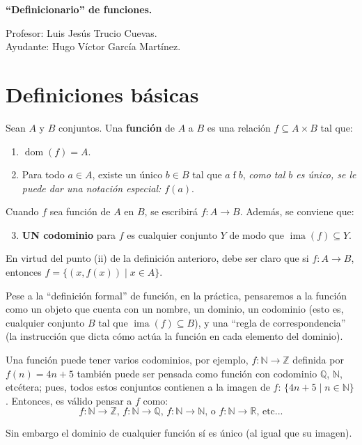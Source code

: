 \documentclass[letterpaper,DIV=14,headsepline,12pt]{scrartcl}
\providecommand\tq{\;|\;}
\DeclareMathOperator{\ima}{ima}
\DeclareMathOperator{\dom}{dom}
\begin{document}
    \pagestyle{scrheadings}
    \thispagestyle{beginstyle}
    \begin{center}
        {\fontsize{30}{60}\rmfamily \textbf{``Definicionario'' de funciones.}}
    \end{center}
    \begin{flushright}
        \footnotesize \hfill Profesor: Luis Jesús Trucio Cuevas.\\
        \hfill Ayudante: Hugo Víctor García Martínez.
    \end{flushright}

    \tableofcontents

    \newpage
    \section{Definiciones básicas}

    \begin{definicion}
        Sean $A$ y $B$ conjuntos. Una \textbf{función} de $A$ a $B$ es una relación $f \subseteq A \times B$ tal que:
        \begin{enumerate}
            \item $\dom(f)=A$.
            \item Para todo $a \in A$, existe un único $b \in B$ tal que $a \mathrel{f} b$, \textit{como tal $b$ es único, se le puede dar una notación especial: $f(a)$}.
        \end{enumerate}
        Cuando $f$ sea función de $A$ en $B$, se escribirá $f: A \to B$. Además, se conviene que:
        \begin{enumerate}\setcounter{enumi}{2}
            \item \textbf{UN codominio} para $f$ es cualquier conjunto $Y$ de modo que $\ima(f) \subseteq Y$.
        \end{enumerate}
    \end{definicion}

    En virtud del punto (ii) de la definición anterioro, debe ser claro que si $f:A \to B$, entonces $f=\{(x,f(x)) \tq x \in A \}$.

    Pese a la ``definición formal'' de función, en la práctica, pensaremos a la función como un objeto que cuenta con un nombre, un dominio, un codominio (esto es, cualquier conjunto $B$ tal que $\ima(f)\subseteq B$), y una ``regla de correspondencia'' (la instrucción que dicta cómo actúa la función en cada elemento del dominio).

    \begin{observacion}
        Una función puede tener varios codominios, por ejemplo, $f:\mathbb{N} \to \mathbb{Z}$ definida por $f(n)=4n+5$ también puede ser pensada como función con codominio $\mathbb{Q}$, $\mathbb{N}$, etcétera; pues, todos estos conjuntos contienen a la imagen de $f$: $\{ 4n+5 \tq n \in \mathbb{N} \}$. Entonces, es válido pensar a $f$ como:
        \[ f:\mathbb{N} \to \mathbb{Z} \text{, } f:\mathbb{N} \to \mathbb{Q} \text{, } f:\mathbb{N} \to \mathbb{N} \text{, o } f:\mathbb{N} \to \mathbb{R} \text{, etc...} \]

        Sin embargo el dominio de cualquier función sí es único (al igual que su imagen).
    \end{observacion}
\end{document}
